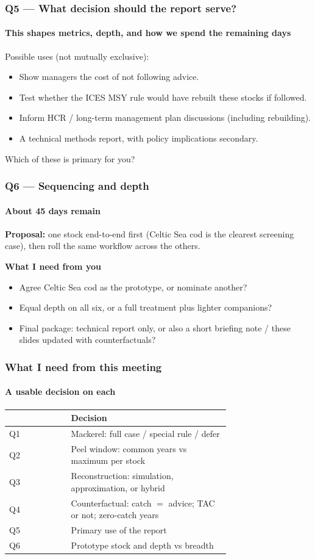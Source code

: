 \documentclass[
  aspectratio=169,
  t,
  onlytextwidth,
  10pt,
]{beamer}
\begin{document}
\begin{frame}
  \frametitle{Q5 --- What decision should the report serve?}
  \framesubtitle{This shapes metrics, depth, and how we spend the remaining days}

  Possible uses (not mutually exclusive):
  \begin{itemize}
    \item Show managers the cost of not following advice.
    \item Test whether the ICES MSY rule would have rebuilt these stocks if followed.
    \item Inform HCR / long-term management plan discussions (including rebuilding).
    \item A technical methods report, with policy implications secondary.
  \end{itemize}

  \vspace{0.4em}
  {\large Which of these is primary for you?}
\end{frame}

\begin{frame}
  \frametitle{Q6 --- Sequencing and depth}
  \framesubtitle{About 45 days remain}

  \textbf{Proposal:} one stock end-to-end first (Celtic Sea cod is the clearest screening case), then roll the same workflow across the others.

  \vspace{0.5em}
  \textbf{What I need from you}
  \begin{itemize}
    \item Agree Celtic Sea cod as the prototype, or nominate another?
    \item Equal depth on all six, or a full treatment plus lighter companions?
    \item Final package: technical report only, or also a short briefing note / these slides updated with counterfactuals?
  \end{itemize}
\end{frame}

\begin{frame}
  \frametitle{What I need from this meeting}
  \framesubtitle{A usable decision on each}

  {\small
  \begin{tabular}{@{}lp{0.72\linewidth}@{}}
    \toprule
    & Decision \\
    \midrule
    Q1 & Mackerel: full case / special rule / defer \\
    Q2 & Peel window: common years vs maximum per stock \\
    Q3 & Reconstruction: simulation, approximation, or hybrid \\
    Q4 & Counterfactual: catch $=$ advice; TAC or not; zero-catch years \\
    Q5 & Primary use of the report \\
    Q6 & Prototype stock and depth vs breadth \\
    \bottomrule
  \end{tabular}}
\end{frame}
\end{document}
